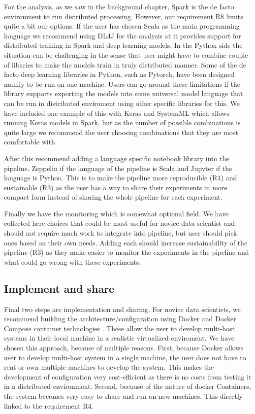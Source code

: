 For the analysis, as we saw in the background chapter, Spark is the de facto environment to run distributed processing.
However, our requirement R8 limits quite a bit our options.
If the user has chosen Scala as the main programming language we recommend using DL4J for the analysis at it provides support for distributed training in Spark and deep learning models.
In the Python side the situation can be challenging in the sense that user might have to combine couple of libaries to make the models train in truly distributed manner.
Some of the de facto deep learning libraries in Python, such as Pytorch, have been designed mainly to be run on one machine.
Users can go around these limitations if the library supports exporting the models into some universal model language that can be run in distributed enviroment using other specific libraries for this.
We have included one example of this with Keras and SystemML which allows running Keras models in Spark, but as the number of possible combinations is quite large we recommend the user choosing combinations that they are most comfortable with.

After this recommend adding a language specific notebook library into the pipeline.
Zeppelin if the language of the pipeline is Scala and Jupyter if the language is Python.
This is to make the pipeline more reproducible (R4) and sustainable (R3) as the user has a way to share their experiments in more compact form instead of sharing the whole pipeline for each experiment.

Finally we have the monitoring which is somewhat optional field.
We have collected here choices that could be most useful for novice data scientist and should not require much work to integrate into pipeline, but user should pick ones based on their own needs.
Adding each should increase sustainability of the pipeline (R3) as they make easier to monitor the experiments in the pipeline and what could go wrong with these experiments.

\subsection{Implement and share}

Final two steps are implementation and sharing.
For novice data scientists, we recommend building the architecture/configuration using Docker and Docker Compose container technologies \cite{docker}.
These allow the user to develop multi-host systems in their local machine in a realistic virtualized enviroment.
We have chosen this approach, because of multiple reasons.
First, because Docker allows user to develop multi-host system in a single machine, the user does not have to rent or own multiple machines to develop the system.
This makes the development of configuration very cost-efficient as there is no costs from testing it in a distributed environment.
Second, because of the nature of docker Containers, the system becomes very easy to share and run on new machines.
This directly linked to the requirement R4.

